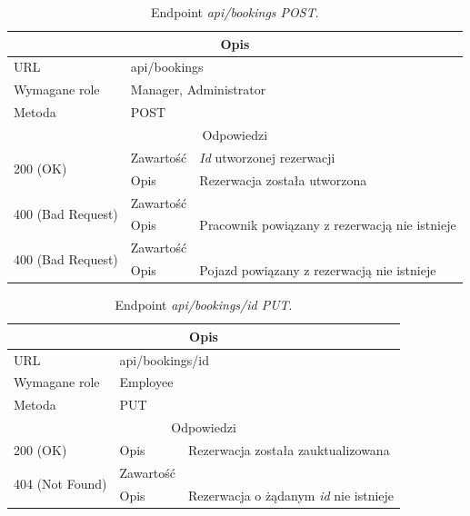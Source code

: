 \documentclass[eng,printmode,openany]{mgr}
\begin{document}
	\begin{table}[H]
		\caption{Endpoint \textit{api/bookings POST}.}
		\begin{tabularx}{\textwidth}{|l|l|X|}
			\hline
			\multicolumn{3}{|c|}{Opis}
			\\ \hline
			URL                       & \multicolumn{2}{l|}{api/bookings}
			\\ \hline
			Wymagane role             & \multicolumn{2}{l|}{Manager, Administrator}
			\\ \hline
			Metoda                    & \multicolumn{2}{l|}{POST}
			\\ \hline
			\multicolumn{3}{|c|}{Odpowiedzi}
			\\ \hline
			\multirow{2}{*}{200 (OK)} 		& Zawartość     & \textit{Id} utworzonej rezerwacji
			\\ \cline{2-3}                  & Opis         	& Rezerwacja została utworzona
			\\ \hline
			\multirow{2}{*}{400 (Bad Request)} 	& Zawartość     &    
			\\ \cline{2-3}                      & Opis          & Pracownik powiązany z rezerwacją nie istnieje      						    
			\\ \hline
			\multirow{2}{*}{400 (Bad Request)} 	& Zawartość     &    
			\\ \cline{2-3}                      & Opis          & Pojazd powiązany z rezerwacją nie istnieje      								
			\\ \hline      
		\end{tabularx}
	\end{table}
	
	\begin{table}[H]
		\caption{Endpoint \textit{api/bookings/id PUT}.}
		\begin{tabularx}{\textwidth}{|l|l|X|}
			\hline
			\multicolumn{3}{|c|}{Opis}
			\\ \hline
			URL                       & \multicolumn{2}{l|}{api/bookings/id}
			\\ \hline
			Wymagane role             & \multicolumn{2}{l|}{Employee}
			\\ \hline
			Metoda                    & \multicolumn{2}{l|}{PUT}
			\\ \hline
			\multicolumn{3}{|c|}{Odpowiedzi}
			\\ \hline
			200 (OK) 		                        & Opis      	& Rezerwacja została zauktualizowana
			\\ \hline
			\multirow{2}{*}{404 (Not Found)} 	    & Zawartość     & 
			\\ \cline{2-3}                          & Opis          & Rezerwacja o żądanym \textit{id} nie istnieje
			\\ \hline
		\end{tabularx}
	\end{table}
	
\end{document}
